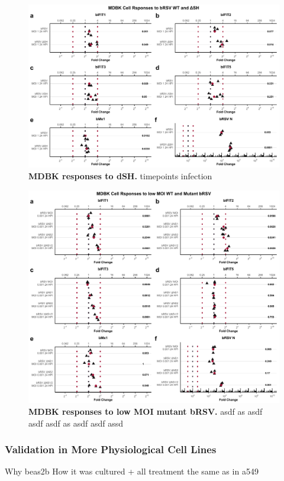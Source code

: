 \begin{figure}
    \centering
    \includegraphics[width=1\linewidth]{07. Chapter 2/Figs/02. Induction/05. mdbk_brsv_moi1_dsh.pdf}
    \caption[MDBK responses to dSH.]{\textbf{MDBK responses to dSH.} timepoints infection }
    \label{MDBK responses to dSH}
\end{figure}

\begin{figure}
    \centering
    \includegraphics[width=1\linewidth]{07. Chapter 2/Figs/02. Induction/06. mdbk_brsv_low_moi.pdf}
    \caption[MDBK responses to low MOI mutant bRSV.]{\textbf{MDBK responses to low MOI mutant bRSV.} asdf as asdf asdf asdf as asdf asdf assd }
    \label{MDBK responses to low MOI mutant bRSV}
\end{figure}



\subsubsection{Validation in More Physiological Cell Lines} \label{Validation in More Physiological Cell Lines}
Why beas2b \newline
How it was cultured + all treatment the same as in a549











